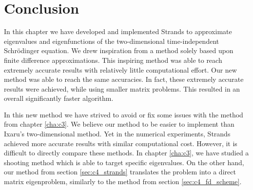 





\section{Conclusion}

In this chapter we have developed and implemented Strands to approximate eigenvalues and eigenfunctions of the two-dimensional time-independent Schrödinger equation. We drew inspiration from a method solely based upon finite difference approximations. This inspiring method was able to reach extremely accurate results with relatively little computational effort. Our new method was able to reach the same accuracies. In fact, these extremely accurate results were achieved, while using smaller matrix problems. This resulted in an overall significantly faster algorithm.

In this new method we have strived to avoid or fix some issues with the method from chapter \ref{cha:c3}. We believe our method to be easier to implement than Ixaru's two-dimensional method. Yet in the numerical experiments, Strands achieved more accurate results with similar computational cost. However, it is difficult to directly compare these methods. In chapter \ref{cha:c3}, we have studied a shooting method which is able to target specific eigenvalues. On the other hand, our method from section \ref{sec:c4_strands} translates the problem into a direct matrix eigenproblem, similarly to the method from section \ref{sec:c4_fd_scheme}.





\stopchapter
